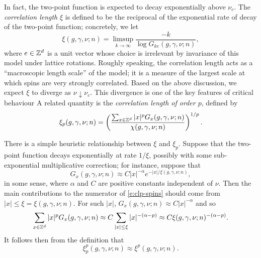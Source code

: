 In fact, the two-point function is expected to decay exponentially above $\nu_c$.
The \emph{correlation length} $\xi$ is defined to be the reciprocal of the exponential
rate of decay of the two-point function; concretely, we let
\begin{equation}
\label{e:cl-spins}
\xi(g, \gamma, \nu; n) = \limsup_{k\to\infty} \frac{-k}{\log G_{ke}(g, \gamma, \nu; n)},
\end{equation}
where $e \in { {{\mathbb Z}}^d }$ is a unit vector whose choice is irrelevant by invariance of this model
under lattice rotations.
Roughly speaking, the correlation length acts as
a ``macroscopic length scale'' of the model; it is a measure of the largest scale at
which spins are very strongly correlated. Based on the above discussion, we expect $\xi$
to diverge as $\nu\downarrow\nu_c$. This divergence is one of the
key features of critical behaviour
A related quantity is the \emph{correlation length of order $p$}, defined by
\begin{equation}
\label{e:clp-spins}
\xi_p(g, \gamma, \nu; n)
	=
\left(\frac{\sum_{x\in{ {{\mathbb Z}}^d }} |x|^p G_x(g, \gamma, \nu; n)}{\chi(g, \gamma, \nu; n)}\right)^{1/p}.
\end{equation}

\begin{rk}
There is a simple heuristic relationship between $\xi$ and $\xi_p$. Suppose that
the two-point function decays exponentially at rate $1/\xi$, possibly with some
sub-exponential multiplicative correction; for instance, suppose that
\begin{equation}
G_x(g, \gamma, \nu; n) \approx C |x|^{-\alpha} e^{-|x|/\xi(g, \gamma, \nu; n)},
\end{equation}
in some sense, where $\alpha$ and $C$ are positive constants independent of $\nu$.
Then the main contributions to the numerator of
\eqref{e:clp-spins} should come from $|x| \le \xi = \xi(g, \gamma, \nu; n)$. For such $|x|$,
$G_x(g, \gamma, \nu; n) \approx C |x|^{-\alpha}$ and so
\begin{equation}
\sum_{x\in{ {{\mathbb Z}}^d }} |x|^p G_x(g, \gamma, \nu; n)
	\approx
C \sum_{|x| \le \xi} |x|^{-(\alpha-p)}
	\approx
C \xi(g, \gamma, \nu; n)^{-(\alpha-p)}.
\end{equation}
It follows then from the definition that
\begin{equation}
\xi^p_p(g, \gamma, \nu; n) \approx \xi^p(g, \gamma, \nu; n).
\end{equation}
\end{rk}


